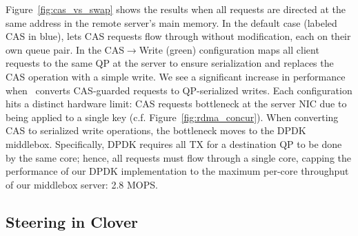 Figure~\ref{fig:cas_vs_swap} shows the results when all requests are
directed at the same address in the remote server's main memory.  In
the default case (labeled CAS in blue), {\sword} lets CAS requests
flow through without modification, each on their own queue pair.  In
the CAS$\rightarrow$Write (green) configuration {\sword} maps all
client requests to the same QP at the server to ensure serialization
and replaces the CAS operation with a simple write.
%
%
We see a significant increase in performance when \sword\ converts
CAS-guarded requests to QP-serialized writes.  Each configuration hits
a distinct hardware limit: CAS requests bottleneck at the server NIC
due to being applied to a single key
(c.f. Figure~\ref{fig:rdma_concur}).  When converting CAS to
serialized write operations, the bottleneck moves to the DPDK
middlebox.
Specifically, DPDK requires all TX for a destination QP to be done by
the same core; hence,
all requests must flow through a single core, capping the  performance of our
DPDK implementation to the maximum per-core
throughput of our middlebox server: 2.8 MOPS.



\subsection{Steering in Clover}


